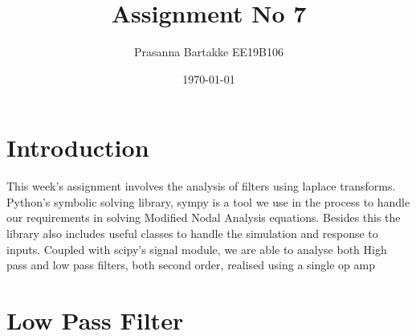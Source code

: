 \documentclass[11pt, a4paper]{article}
\title{Assignment No 7} %
\author{Prasanna Bartakke EE19B106} %
\date{\today} %
\begin{document}
		
		
\maketitle %
\section{Introduction}
This week’s assignment involves the analysis of filters using laplace transforms. Python’s symbolic solving library, sympy is a tool we use in the process to handle our requirements in solving Modified Nodal Analysis equations. Besides this the library also includes useful classes to handle the simulation and response to inputs. Coupled with scipy’s signal module, we are able to analyse both High pass and low pass filters, both second order, realised using a single op amp
\section{Low Pass Filter}
\end{document}
